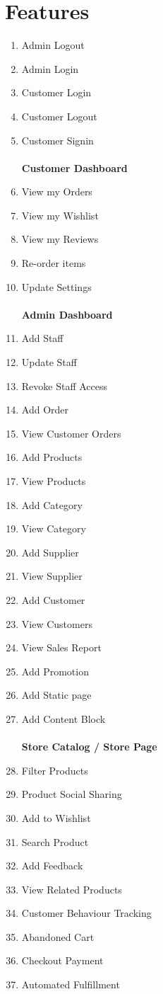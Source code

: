 \documentclass{report}
\begin{document}
\section{Features}
\begin{enumerate}
\item Admin Logout
\item Admin Login
\item Customer Login
\item Customer Logout
\item Customer Signin \\ \\
\textbf{Customer Dashboard}
\item View my Orders
\item View my Wishlist
\item View my Reviews
\item Re-order items
\item Update Settings \\ \\
\textbf{Admin Dashboard}
\item Add Staff
\item Update Staff
\item Revoke Staff Access
\item Add Order
\item View Customer Orders
\item Add Products
\item View Products
\item Add Category
\item View Category
\item Add Supplier
\item View Supplier 
\item Add Customer
\item View Customers
\item View Sales Report
\item Add Promotion 
\item Add Static page
\item Add Content Block \\ \\
\textbf{Store Catalog / Store Page}
\item Filter Products
\item Product Social Sharing
\item Add to Wishlist
\item Search Product
\item Add Feedback
\item View Related Products
\item Customer Behaviour Tracking
\item Abandoned Cart
\item Checkout Payment
\item Automated Fulfillment
\end{enumerate}
\end{document}
